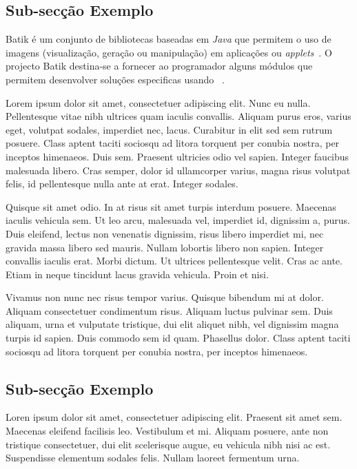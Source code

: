 \subsection{Sub-secção Exemplo} \label{batik} 

Batik é um conjunto de bibliotecas baseadas em \textit{Java} que
permitem o uso de imagens \svg{} (visualização, geração ou
manipulação) em aplicações ou \textit{applets}~\citep{kn:batik}.  
O projecto Batik destina-se a fornecer ao programador
alguns módulos que permitem desenvolver soluções especificas usando
\svg~\citep{kn:svgdoc}. 

Lorem ipsum dolor sit amet, consectetuer adipiscing elit. Nunc eu
nulla. Pellentesque vitae nibh ultrices quam iaculis
convallis. Aliquam purus eros, varius eget, volutpat sodales,
imperdiet nec, lacus. Curabitur in elit sed sem rutrum posuere. Class
aptent taciti sociosqu ad litora torquent per conubia nostra, per
inceptos himenaeos. Duis sem. Praesent ultricies odio vel
sapien. Integer faucibus malesuada libero. Cras semper, dolor id
ullamcorper varius, magna risus volutpat felis, id pellentesque nulla
ante at erat. Integer sodales. 

Quisque sit amet odio. In at risus sit amet turpis interdum
posuere. Maecenas iaculis vehicula sem. Ut leo arcu, malesuada vel,
imperdiet id, dignissim a, purus. Duis eleifend, lectus non venenatis
dignissim, risus libero imperdiet mi, nec gravida massa libero sed
mauris. Nullam lobortis libero non sapien. Integer convallis iaculis
erat. Morbi dictum. Ut ultrices pellentesque velit. Cras ac
ante. Etiam in neque tincidunt lacus gravida vehicula. Proin et nisi. 

Vivamus non nunc nec risus tempor varius. Quisque bibendum mi at
dolor. Aliquam consectetuer condimentum risus. Aliquam luctus pulvinar
sem. Duis aliquam, urna et vulputate tristique, dui elit aliquet nibh,
vel dignissim magna turpis id sapien. Duis commodo sem id
quam. Phasellus dolor. Class aptent taciti sociosqu ad litora torquent
per conubia nostra, per inceptos himenaeos. 

\subsection{Sub-secção Exemplo}

Loren ipsum dolor sit amet, consectetuer adipiscing elit. 
Praesent sit amet sem. Maecenas eleifend facilisis leo. Vestibulum et
mi. Aliquam posuere, ante non tristique consectetuer, dui elit
scelerisque augue, eu vehicula nibh nisi ac est. Suspendisse elementum
sodales felis. Nullam laoreet fermentum urna. 

